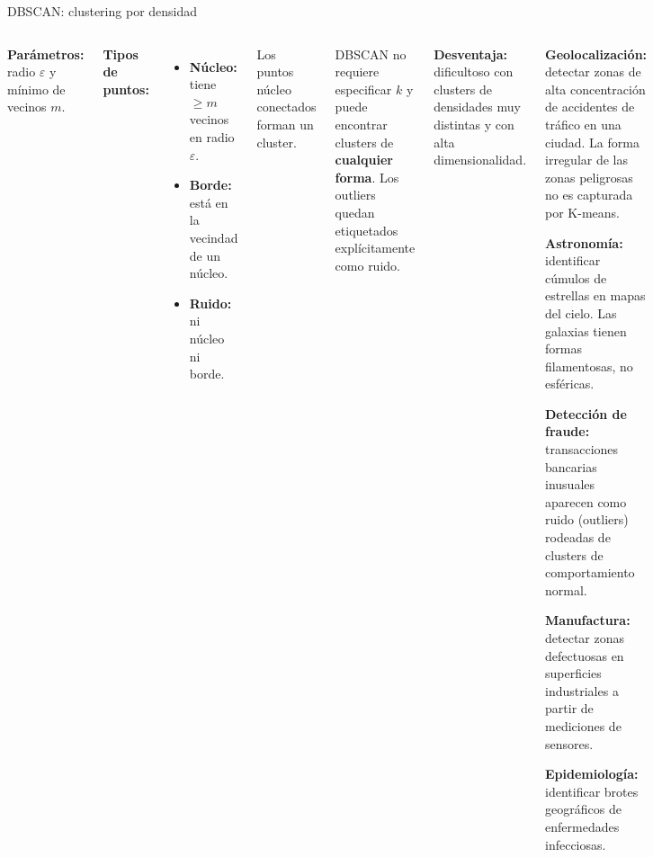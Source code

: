 \documentclass[aspectratio=169]{beamer}
\begin{document}
\begin{frame}{DBSCAN: clustering por densidad}
\begin{columns}[T]
\textbf{Parámetros:} radio $\varepsilon$ y mínimo de vecinos $m$.

\medskip
\textbf{Tipos de puntos:}
\begin{itemize}
  \item \textbf{Núcleo:} tiene $\geq m$ vecinos en radio $\varepsilon$.
  \item \textbf{Borde:} está en la vecindad de un núcleo.
  \item \textbf{Ruido:} ni núcleo ni borde.
\end{itemize}

\medskip
Los puntos núcleo conectados forman un cluster.

\medskip
\begin{concepto}
DBSCAN no requiere especificar $k$ y puede encontrar clusters de \textbf{cualquier forma}. Los outliers quedan etiquetados explícitamente como ruido.
\end{concepto}

\medskip
\textbf{Desventaja:} dificultoso con clusters de densidades muy distintas y con alta dimensionalidad.

\begin{aplicacion}
\textbf{Geolocalización:} detectar zonas de alta concentración de accidentes de tráfico en una ciudad. La forma irregular de las zonas peligrosas no es capturada por K-means.

\medskip
\textbf{Astronomía:} identificar cúmulos de estrellas en mapas del cielo. Las galaxias tienen formas filamentosas, no esféricas.

\medskip
\textbf{Detección de fraude:} transacciones bancarias inusuales aparecen como ruido (outliers) rodeadas de clusters de comportamiento normal.

\medskip
\textbf{Manufactura:} detectar zonas defectuosas en superficies industriales a partir de mediciones de sensores.

\medskip
\textbf{Epidemiología:} identificar brotes geográficos de enfermedades infecciosas.
\end{aplicacion}
\end{columns}
\end{frame}
\end{document}
